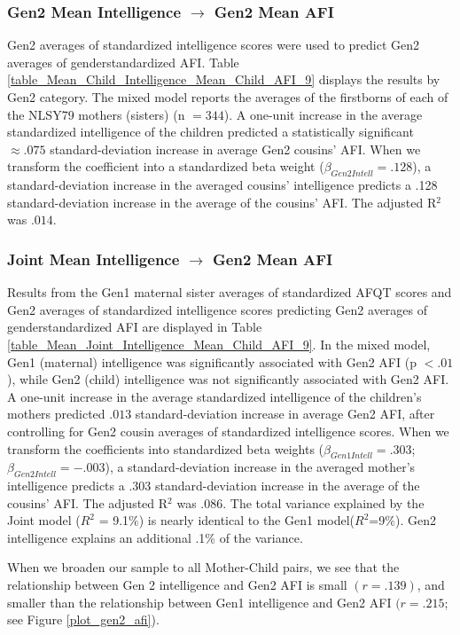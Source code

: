 \subsubsection{Gen2 Mean Intelligence $\rightarrow$ Gen2 Mean AFI} Gen2 averages of standardized intelligence scores were used to predict Gen2 averages of gender\hyph standardized AFI. Table \ref{table_Mean_Child_Intelligence_Mean_Child_AFI_9} displays the results by Gen2 category. The mixed model reports the averages of the firstborns of each of the NLSY79 mothers (sisters) (n $= 344$). A one-unit increase in the average standardized intelligence of the children predicted a statistically significant $\approx .075$ standard-deviation increase in average Gen2 cousins' AFI. When we transform the coefficient into a standardized beta weight ($\beta_{Gen2 Intell} = .128$), a standard-deviation increase in the averaged cousins' intelligence predicts a .128 standard-deviation increase in the average of the cousins' AFI. The adjusted R$^{2}$ was $.014$.

\subsubsection{Joint Mean Intelligence $\rightarrow$ Gen2 Mean AFI} Results from the Gen1 maternal sister averages of standardized AFQT scores and Gen2 averages of standardized intelligence scores predicting Gen2 averages of gender\hyph standardized AFI are displayed in Table \ref{table_Mean_Joint_Intelligence_Mean_Child_AFI_9}. In the mixed model, Gen1 (maternal) intelligence was significantly associated with Gen2 AFI (p $< .01$), while Gen2 (child) intelligence was not significantly associated with Gen2 AFI. A one-unit increase in the average standardized intelligence of the children's mothers predicted $.013$ standard-deviation increase in average Gen2 AFI, after controlling for Gen2 cousin averages of standardized intelligence scores. When we transform the coefficients into standardized beta weights ($\beta_{Gen1 Intell} = .303$; $\beta_{Gen2 Intell} = -.003$), a standard-deviation increase in the averaged mother's intelligence predicts a .303 standard-deviation increase in the average of the cousins' AFI. The adjusted R$^{2}$ was $.086$. The total variance explained by the Joint model ($R^{2}$ = 9.1$\%$) is nearly identical to the Gen1 model($R^{2}$=9$\%$). Gen2 intelligence explains an additional .1\% of the variance.

When we broaden our sample to all Mother-Child pairs, we see that the relationship between Gen 2 intelligence and Gen2 AFI is small $(r =.139)$, and smaller than the relationship between Gen1 intelligence and Gen2 AFI $(r=.215$; see Figure \ref{plot_gen2_afi}).

